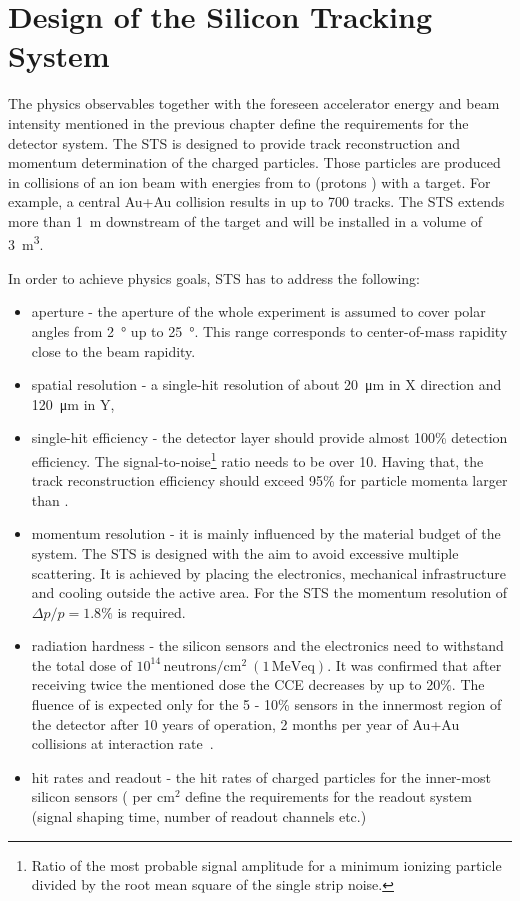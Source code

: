 \section{Design of the Silicon Tracking System}
\label{STS}

The physics observables together with the foreseen accelerator energy and beam intensity mentioned in the previous chapter define the requirements for the detector system. The \gls{STS} is designed to provide track reconstruction and momentum determination of the charged particles. Those particles are produced in collisions of an ion beam with energies from  to  (protons ) with a target. For example, a central Au+Au collision results in up to 700 tracks. The \gls{STS} extends more than \SI{1}{\metre} downstream of the target and will be installed in a volume of \SI{3}{\cubic\metre}. 

In order to achieve physics goals, \gls{STS} has to address the following:
\begin{itemize}
    \item  aperture - the aperture of the whole experiment is assumed to cover polar angles from \SI{2}{\degree} up to \SI{25}{\degree}. This range corresponds to center-of-mass rapidity close to the beam rapidity. 
    \item spatial resolution - a single-hit resolution of about \SI{20}{\micro\metre} in X direction and \SI{120}{\micro\metre} in Y, 
    \item single-hit efficiency - the detector layer should provide almost 100\% detection efficiency. The signal-to-noise\footnote{Ratio of the most probable signal amplitude for a minimum ionizing particle divided by the root mean square of the single strip noise.} ratio needs to be over 10. Having that, the track reconstruction efficiency should exceed 95\% for particle momenta larger than . 
    \item momentum resolution - it is mainly influenced by the material budget of the system. The \gls{STS} is designed with the aim to avoid excessive multiple scattering. It is achieved by placing the electronics, mechanical infrastructure and cooling outside the active area. For the \gls{STS} the momentum resolution of $\Delta p/p = 1.8\%$ is required. 
    \item radiation hardness - the silicon sensors and the electronics need to withstand the total dose of $10^{14}\,\mathrm{neutrons/cm^{2}~(1\,MeV eq)}$. It was confirmed that after receiving twice the mentioned dose the CCE decreases by up to 20\%. The fluence of  is expected only for the 5 - 10\% sensors in the innermost region of the detector after 10 years of operation, 2 months per year of  Au+Au collisions at  interaction rate~\cite{Heuser:54798}.
    \item hit rates and readout - the hit rates of charged particles for the inner-most silicon sensors ( per $\mathrm{cm^{2}}$ define the requirements for the readout system (signal shaping time, number of readout channels etc.)
\end{itemize}


